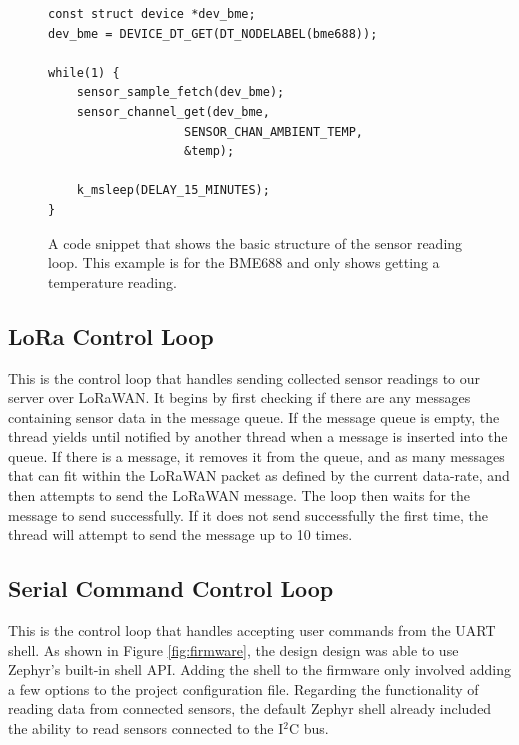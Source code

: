 \documentclass[conference]{IEEEtran}
\newcommand*{\iic}{I$^2$C\xspace}
\begin{document}
\begin{figure}
\begin{Verbatim}[frame=single, language=C, fontsize=\footnotesize]
const struct device *dev_bme;
dev_bme = DEVICE_DT_GET(DT_NODELABEL(bme688));

while(1) {
    sensor_sample_fetch(dev_bme);
    sensor_channel_get(dev_bme, 
                   SENSOR_CHAN_AMBIENT_TEMP, 
                   &temp);
                   
    k_msleep(DELAY_15_MINUTES);
}
\end{Verbatim}
\caption{A code snippet that shows the basic structure of the sensor reading loop. This example is for the BME688 and only shows getting a temperature reading.}
\label{fig:sensor_loop}
\end{figure}

\subsection{LoRa Control Loop}
This is the control loop that handles sending collected sensor readings to our server over LoRaWAN. It begins by first checking if there are any messages containing sensor data in the message queue. If the message queue is empty, the thread yields until notified by another thread when a message is inserted into the queue. If there is a message, it removes it from the queue, and as many messages that can fit within the LoRaWAN packet as defined by the current data-rate, and then attempts to send the LoRaWAN message. The loop then waits for the message to send successfully. If it does not send successfully the first time, the thread will attempt to send the message up to 10 times.

\subsection{Serial Command Control Loop}
This is the control loop that handles accepting user commands from the UART shell. As shown in Figure \ref{fig:firmware}, the design design was able to use Zephyr's built-in shell API. Adding the shell to the firmware only involved adding a few options to the project configuration file. Regarding the functionality of reading data from connected sensors, the default Zephyr shell already included the ability to read sensors connected to the \iic bus. %
\end{document}
